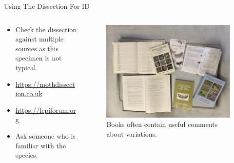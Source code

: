 \documentclass[
  ignorenonframetext,
]{beamer}
\providecommand{\tightlist}{%
  \setlength{\itemsep}{0pt}\setlength{\parskip}{0pt}}
\begin{document}
\begin{frame}{Using The Dissection For ID}
\protect\hypertarget{using-the-dissection-for-id}{}
\begin{columns}[T]
\begin{column}{0.5\textwidth}
\begin{itemize}
\tightlist
\item
  Check the dissection against multiple sources as this specimen is not
  typical.
\item
  \url{https://mothdissection.co.uk}
\item
  \url{https://lepiforum.org}
\item
  Ask someone who is familiar with the species.
\end{itemize}
\end{column}

\begin{column}{0.5\textwidth}
\begin{figure}
\centering
\includegraphics{./images/research.jpg}
\caption{Books often contain useful comments about variations.}
\end{figure}
\end{column}
\end{columns}
\end{frame}
\end{document}

